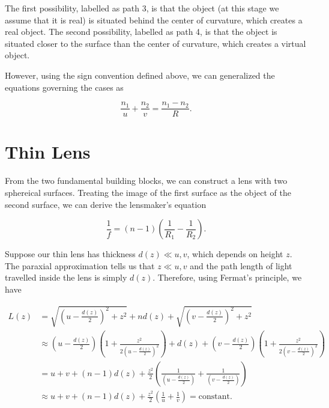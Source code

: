\documentclass[english,a4paper,12pt]{report}
\begin{document}

The first possibility, labelled as path 3, is that the object (at this stage we assume that it is real) is situated behind the center of curvature, which creates a real object. The second possibility, labelled as path 4, is that the object is situated closer to the surface than the center of curvature, which creates a virtual object.

However, using the sign convention defined above, we can generalized the equations governing the cases as 

\begin{equation}
    \frac{n_1 }{u} + \frac{n_2 }{v} = \frac{n_1 - n_2 }{R}.
\end{equation}

\section{Thin Lens}

From the two fundamental building blocks, we can construct a lens with two sphereical surfaces. Treating the image of the first surface as the object of the second surface, we can derive the lensmaker's equation 

\begin{equation}
    \frac{1}{f} = (n-1) \left(\frac{1}{R_1 } - \frac{1}{R_2 }\right).  
\end{equation}



Suppose our thin lens has thickness \(d(z) \ll  u,v \), which depends on height \(z\). The paraxial approximation tells us that \(z \ll  u,v\) and the path length of light travelled inside the lens is simply \(d(z)\). Therefore, using Fermat's principle, we have

\begin{equation}
    \begin{aligned} 
    L(z) &= \sqrt{\left(u-\frac{d(z)}{2}\right) ^2+z^2} + nd(z) + \sqrt{\left( v-\frac{d(z)}{2}  \right)^2+z^2} \\
    &\approx  \left( u- \frac{d(z)}{2}  \right) \left( 1 + \frac{z^2}{2\left( u - \frac{d(z)}{2}  \right)^2}  \right) + d(z) + \left( v- \frac{d(z)}{2}  \right) \left( 1 + \frac{z^2}{2\left( v - \frac{d(z)}{2}  \right)^2}  \right) \\
    &= u + v + (n-1) d(z) + \frac{z^2}{2} \left( \frac{1}{\left( u-\frac{d(z)}{2}  \right)} + \frac{1}{\left( v-\frac{d(z)}{2}  \right)}  \right) \\
    &\approx u+v+(n-1)d(z) + \frac{z^2}{2}(\frac{1}{u} + \frac{1}{v}  ) = \text{constant}.  
    \end{aligned} 
\end{equation}
\end{document}
